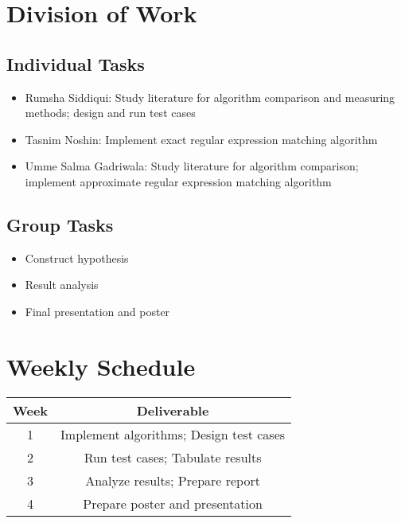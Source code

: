 \documentclass[letterpaper,12pt]{article}
\begin{document}
\section{Division of Work}


\subsection{Individual Tasks}
\begin{itemize}
\item  Rumsha Siddiqui: Study literature for algorithm comparison and measuring methods; design and run test cases
\item  Tasnim Noshin: Implement exact regular expression matching algorithm
\item Umme Salma Gadriwala: Study literature for algorithm comparison; implement approximate regular expression matching algorithm
\end{itemize}

   
\subsection{Group Tasks}
\begin{itemize}
\item  Construct hypothesis
\item Result analysis
\item  Final presentation and poster
\end{itemize}



\section{Weekly Schedule}


\begin{table}[ht]
\begin{center}

\label{tbl:bins} %
\begin{tabular}{|cc|} 
\hline
\multicolumn{1}{|c}{\textbf{Week}} & \multicolumn{1}{c|}{\textbf{Deliverable}} \\
\hline
1 &  Implement algorithms; Design test cases \\
2 &   Run test cases; Tabulate results \\
3 &   Analyze results; Prepare report \\
4 &   Prepare poster and presentation \\
\hline
\end{tabular}
\end{center}
\end{table}
\end{document}
